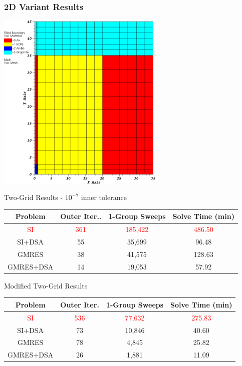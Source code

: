 \documentclass[compress,10pt]{beamer}
\newcommand{\tcr}[1]{\textcolor{red}{#1}}
\begin{document}
\begin{frame}[t]\frametitle{2D Variant Results}{\footnotesize
{}
{
\hspace*{1.75cm}
{}\includegraphics[width=0.60\textwidth]{images/2D_IM1_Variant_Layout.png}
}
{
\begin{block}{Two-Grid Results - $10^{-7}$ inner tolerance}
\begin{table}
\begin{tabular}{|c|c|c|c|}
\hline
Problem & Outer Iter.. & 1-Group Sweeps & Solve Time (min)  \\
\hline \hline
\tcr{SI} & \tcr{361}  &\tcr{185,422}  &  \tcr{486.50} \\ \hline
SI+DSA & 55  & 35,699 &  96.48 \\ \hline
GMRES & 38  & 41,575 &  128.63 \\ \hline
GMRES+DSA & 14 &  19,053  & 57.92  \\ \hline
\end{tabular}
\end{table}
\end{block}
\vspace{-3mm}
\begin{block}{Modified Two-Grid Results}
\begin{table}
\begin{tabular}{|c|c|c|c|}
\hline
Problem & Outer Iter. & 1-Group Sweeps & Solve Time (min)  \\
\hline \hline
\tcr{SI} & \tcr{536}  & \tcr{77,632} & \tcr{275.83}  \\ \hline
SI+DSA & 73  & 10,846 &  40.60 \\ \hline
GMRES & 78  & 4,845 &  25.82 \\ \hline
GMRES+DSA & 26  & 1,881 & 11.09  \\ \hline

\end{tabular}
\end{table}
\end{block}}}
\end{frame}
\end{document}
